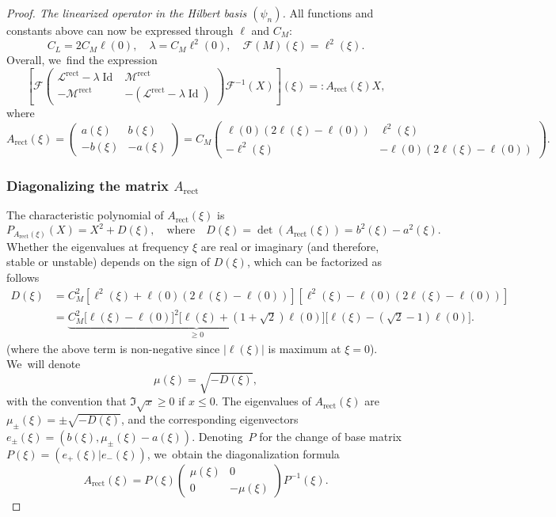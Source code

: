 \documentclass[10pt]{amsart}
\DeclareMathOperator{\Id}{Id}
\theoremstyle{definition}
\newcommand{\pa}[1]{\left(#1\right)}
\newcommand{\pac}[1]{\left[#1\right]}
\newcommand{\bpac}[1]{\bigl[#1\bigr]}
\begin{document}
\begin{proof}[Proof. The linearized operator in the Hilbert basis $(\psi_n)$]
All functions and constants above can now be expressed through $\ell$ and $C_M$:
\[
C_L = 2 C_M \ell(0), \quad \lambda = C_M \ell^2(0), \quad \mathcal{F}(M)(\xi) = \ell^2(\xi).
\]
Overall, we~find the expression
\begin{equation*}
\pac{\mathcal{F}\begin{pmatrix} \mathcal{L}^{\mathrm{rect}}-\lambda \Id & \mathcal{M}^{\mathrm{rect}} \\[2pt] -\mathcal{M}^{\mathrm{rect}} & - (\mathcal{L}^{\mathrm{rect}}-\lambda \Id) \end{pmatrix}\mathcal{F}^{-1}(X)}\pa{\xi} =:A_{\mathrm{rect}}(\xi)X,
\end{equation*}
where
\begin{equation*}
A_{\mathrm{rect}}(\xi) = \begin{pmatrix} a(\xi) & b(\xi) \\[2pt] -b(\xi) & -a(\xi) \end{pmatrix} =C_M \begin{pmatrix} \ell(0)(2\ell(\xi)-\ell(0)) & \ell^2(\xi) \\[2pt] -\ell^2(\xi) & -\ell(0)(2\ell(\xi)-\ell(0)) \end{pmatrix}.
\end{equation*}

\subsubsection*{Diagonalizing the matrix $A_{\mathrm{rect}}$}
The characteristic polynomial of $A_{\mathrm{rect}}(\xi)$ is
\[
P_{A_{\mathrm{rect}}(\xi)}(X) = X^2 + D(\xi), \quad \text{where} \quad D(\xi) = \det(A_{\mathrm{rect}}(\xi)) = b^2(\xi) - a^2(\xi).
\]
Whether the eigenvalues at frequency $\xi$ are real or imaginary (and therefore, stable or unstable) depends on the sign of $D(\xi)$, which can be factorized as follows
\begin{align*}
D(\xi) &= C_M^2\pac{\ell^2(\xi)+\ell(0)(2\ell(\xi)-\ell(0))}\pac{\ell^2(\xi)-\ell(0)(2\ell(\xi)-\ell(0))} \\
&= \underbrace{C_M^2\bpac{\ell(\xi)-\ell(0)}^2\bpac{\ell(\xi)+(1+\sqrt{2})\ell(0)}}_{\geq 0}\bpac{\ell(\xi)-(\sqrt{2}-1)\ell(0)}.
\end{align*}
(where the above term is non-negative since $|\ell(\xi)|$ is maximum at $\xi=0$). We~will denote
\[
\mu(\xi) = \sqrt{-D(\xi)},
\]
with the convention that $\Im  \sqrt x \geq 0$ if $x \leq 0$. The eigenvalues of $A_{\mathrm{rect}}(\xi)$ are $\mu_{\pm} (\xi)= \pm \sqrt{-D(\xi)}$, and the corresponding eigenvectors $e_{\pm}(\xi) = (b(\xi), \mu_{\pm}(\xi) - a(\xi))$. Denoting~$P$ for the change of base matrix $P(\xi) = (e_+(\xi) | e_-(\xi))$, we~obtain the diagonalization formula
\[
A_{\mathrm{rect}}(\xi) = P(\xi) \begin{pmatrix} \mu(\xi) & 0 \\ 0 & -\mu(\xi) \end{pmatrix} P^{-1}(\xi).
\]

\end{proof}
\end{document}
